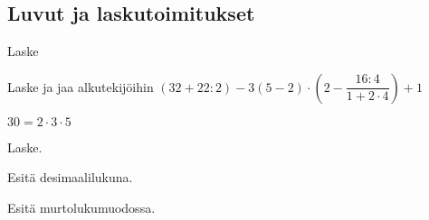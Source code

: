 \subsection*{Luvut ja laskutoimitukset}
\begin{multicols}{2}
\begin{tehtava}
	Laske
	\begin{vastaus}
	\end{vastaus}
\end{tehtava}

\begin{tehtava}
	Laske ja jaa alkutekijöihin
	$(32+22:2)-3(5-2)\cdot\left(2-\dfrac{16:4}{1+2\cdot4}\right)+1$
\begin{vastaus}
	$30=2\cdot3\cdot5$

\end{vastaus}
\end{tehtava}

\begin{tehtava}
	Laske.

\begin{vastaus}
\end{vastaus}
\end{tehtava}

\begin{tehtava}
	Esitä desimaalilukuna.

\begin{vastaus}
\end{vastaus}
\end{tehtava}

\begin{tehtava}
	Esitä murtolukumuodossa.

\begin{vastaus}
\end{vastaus}
\end{tehtava}


\end{multicols}
